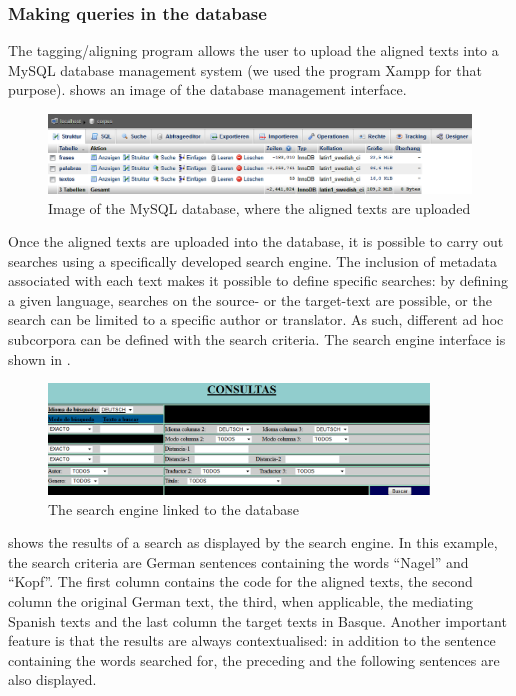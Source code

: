 \documentclass[output=paper]{LSP/langsci}
\begin{document}
\subsubsection{Making queries in the database} 
The tagging/aligning program allows the user to upload the aligned texts into a MySQL database management system (we used the program Xampp for that purpose).  shows an image of the database management interface.

\begin{figure} 
\includegraphics[width=1.0\textwidth]{./figures/6-5.png}
\caption{Image of the MySQL database, where the aligned texts are uploaded} \label{fig:3:5}
\end{figure}

Once the aligned texts are uploaded into the database, it is possible to carry out searches using a specifically developed search engine. The inclusion of metadata associated with each text makes it possible to define specific searches: by defining a given language, searches on the source- or the target-text are possible, or the search can be limited to a specific author or translator. As such, different ad hoc subcorpora can be defined with the search criteria. The search engine interface is shown in .


\begin{figure} 
\includegraphics[width=0.9\textwidth]{./figures/6-6.png}
\caption{The search engine linked to the database} \label{fig:3:6}
\end{figure}

 shows the results of a search as displayed by the search engine. In this example, the search criteria are German sentences containing the words “Nagel” and “Kopf”. The first column contains the code for the aligned texts, the second column the original German text, the third, when applicable, the mediating Spanish texts and the last column the target texts in Basque. Another important feature is that the results are always contextualised: in addition to the sentence containing the words searched for, the preceding and the following sentences are also displayed.
\end{document}
